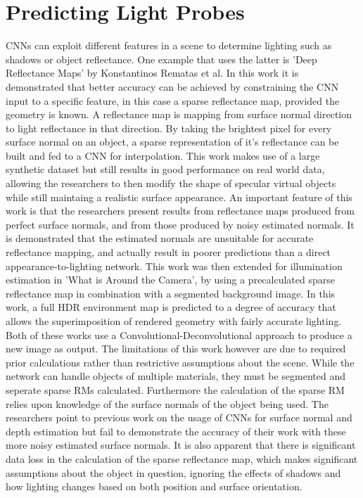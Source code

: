 \documentclass[ %
                    author={Gavin Parker},
                supervisor={Dr. Neill Campbell},
                    degree={MEng},
                     title={Deep Siamese Networks for Illumination Estimation from Stereo Images},
                  subtitle={},
                      type={research},
                      year={2018} ]{dissertation}
\begin{document}
\section{Predicting Light Probes}
CNNs can exploit different features in a scene to determine lighting such as shadows or object reflectance. One example that uses the latter is 'Deep Reflectance Maps' \cite{RematasCVPR2016} by Konstantinos Rematas et al. In this work it is demonstrated that better accuracy can be achieved by constraining the CNN input to a specific feature, in this case a sparse reflectance map, provided the geometry is known. A reflectance map is mapping from surface normal direction to light reflectance in that direction. By taking the brightest pixel for every surface normal on an object, a sparse representation of it's reflectance can be built and fed to a CNN for interpolation. This work makes use of a large synthetic dataset but still results in good performance on real world data, allowing the researchers to then modify the shape of specular virtual objects while still maintaing a realistic surface appearance. An important feature of this work is that the researchers present results from reflectance maps produced from perfect surface normals, and from those produced by noisy estimated normals. It is demonstrated that the estimated normals are unsuitable for accurate reflectance mapping, and actually result in poorer predictions than a direct appearance-to-lighting network.
\newline
This work was then extended for illumination estimation in 'What is Around the Camera', by using a precalculated sparse reflectance map in combination with a segmented background image. In this work, a full HDR environment map is predicted to a degree of accuracy that allows the superimposition of rendered geometry with fairly accurate lighting. Both of these works use a Convolutional-Deconvolutional approach to produce a new image as output. The limitations of this work however are due to required prior calculations rather than restrictive assumptions about the scene. While the network can handle objects of multiple materials, they must be segmented and seperate sparse RMs calculated. Furthermore the calculation of the sparse RM relies upon knowledge of the surface normals of the object being used. The researchers point to previous work  on the usage of CNNs for surface normal and depth estimation but fail to demonstrate the accuracy of their work with these more noisy estimated surface normals. It is also apparent that there is significant data loss in the calculation of the sparse reflectance map, which makes significant assumptions about the object in question, ignoring the effects of shadows and how lighting changes based on both position and surface orientation.
\end{document}
